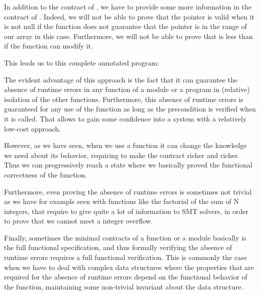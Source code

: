 In addition to the contract of , we have to provide some more
information in the contract of . Indeed, we will not be able
to prove that the pointer is valid when it is not null if the function does not
guarantee that the pointer is in the range of our array in this case.
Furthermore, we will not be able to prove that  is less than
 if the function can modify it.


This leads us to this complete annotated program:






The evident advantage of this approach is the fact that it can guarantee the
absence of runtime errors in any function of a module or a program in (relative)
isolation of the other functions. Furthermore, this absence of runtime errors
is guaranteed for any use of the function as long as the precondition is
verified when it is called. That allows to gain some confidence into a system
with a relatively low-cost approach.



However, as we have seen, when we use a function it can change the knowledge
we need about its behavior, requiring to make the contract richer and richer.
Thus we can progressively reach a state where we basically proved the functional
correctness of the function.



Furthermore, even proving the absence of runtime errors is sometimes not trivial
as we have for example seen with functions like the factorial of the sum of
N integers, that require to give quite a lot of information to SMT solvers, in
order to prove that we cannot meet a integer overflow.



Finally, sometimes the minimal contracts of a function or a module basically
is the full functional specification, and thus formally verifying the absence
of runtime errors requires a full functional verification. This is commonly the
case when we have to deal with complex data structures where the properties
that are required for the absence of runtime errors depend on the functional
behavior of the function, maintaining some non-trivial invariant about the
data structure.







